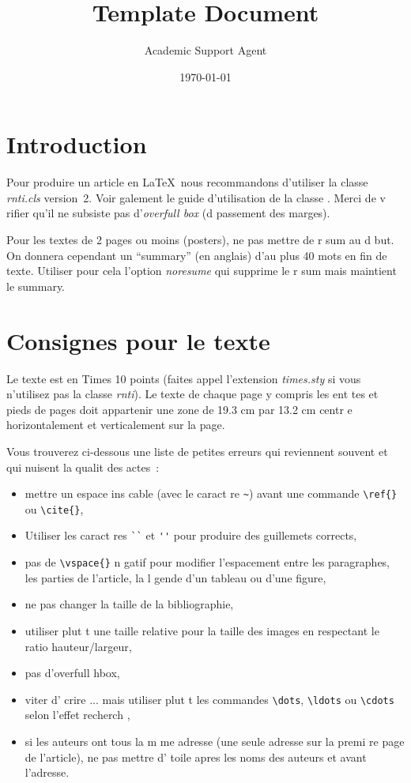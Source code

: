 \documentclass{article}
\title{Template Document}
\author{Academic Support Agent}
\date{\today}
\begin{document}
\maketitle


%
\section{Introduction}

Pour produire un article en \LaTeX\ nous recommandons d'utiliser la
classe \textit{rnti.cls} version~2. Voir  galement le guide
d'utilisation de la classe \citep{ritschard:2005rnti}. Merci de
v rifier qu'il ne subsiste pas d'\emph{overfull box} (d passement
des marges).

Pour les textes de 2 pages ou moins (posters), ne pas mettre de
r sum  au d but. On donnera cependant un ``summary'' (en anglais)
d'au plus 40 mots en fin de texte. Utiliser pour cela l'option
\textit{noresume} qui supprime le r sum  mais maintient le summary.

\section{Consignes pour le texte}


Le texte est en Times 10 points (faites appel   l'extension
\textit{times.sty} si vous n'utilisez pas la classe \textit{rnti}).
Le texte de chaque page y compris les ent tes et pieds de pages doit
appartenir   une zone de 19.3 cm par 13.2 cm centr e horizontalement
et verticalement sur la page.

Vous trouverez ci-dessous une liste de petites erreurs qui reviennent souvent et qui nuisent   la qualit  des actes~:
\begin{itemize}
\item mettre un espace ins cable (avec le caract re \verb+~+) avant une commande \verb+\ref{}+ ou   \verb+\cite{}+,
\item  Utiliser les caract res  \verb+``+ et \verb+''+ pour produire des guillemets  corrects,
\item pas de \verb+\vspace{}+ n gatif pour modifier l'espacement entre les paragraphes, les 
parties de l'article, la l gende d'un tableau ou d'une figure, 
\item ne pas changer la taille de la bibliographie,
\item utiliser plut t une taille relative pour la taille des images en respectant 
le ratio hauteur/largeur,
\item pas d'overfull hbox,
\item  viter d' crire ... mais utiliser plut t les commandes \verb+\dots+, \verb+\ldots+  ou \verb+\cdots+ selon l'effet recherch ,
\item si les auteurs ont tous la m me adresse (une seule adresse sur la premi re page de l'article), ne pas mettre d' toile apres les noms des auteurs et avant l'adresse.
\end{itemize}
\end{document}
